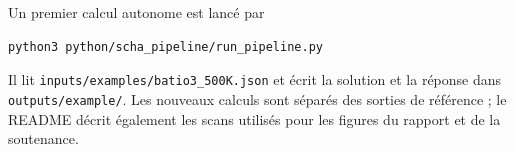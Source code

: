 Un premier calcul autonome est lancé par
\begin{verbatim}
python3 python/scha_pipeline/run_pipeline.py
\end{verbatim}
Il lit \texttt{inputs/examples/batio3\_500K.json} et écrit la solution et la
réponse dans \texttt{outputs/example/}. Les nouveaux calculs sont séparés des
sorties de référence ; le README décrit également les scans utilisés pour les
figures du rapport et de la soutenance.
